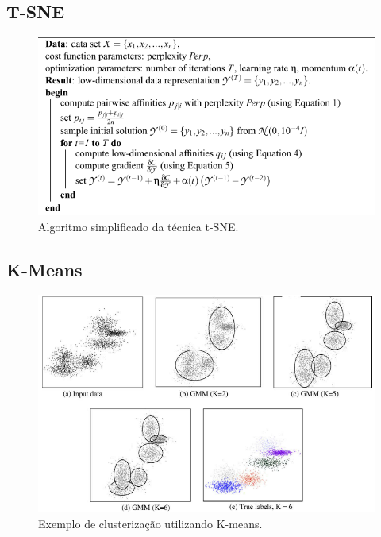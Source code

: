% 

\subsection{T-SNE}

\begin{figure}[H]
    \caption{Algoritmo simplificado da técnica t-SNE.}
    \begin{center}
        \includegraphics[scale=.45]{referencial/img/t-sne_algorithm_maaten_p9.png}
    \end{center}
    \label{fig:}
\end{figure}

% 

\subsection{K-Means}

\begin{figure}[H]
    \caption{Exemplo de clusterização utilizando K-means.}
    \begin{center}
        \includegraphics[scale=.5]{referencial/img/k-means_jain_p7.png}
    \end{center}
    \label{fig:}
\end{figure}


